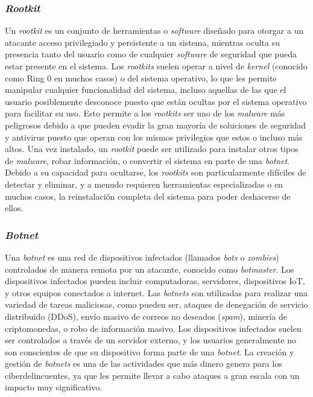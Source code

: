 \subsubsection{\textit{Rootkit}}
Un \textit{rootkit} es un conjunto de herramientas o \textit{software} diseñado para otorgar a un atacante acceso privilegiado y persistente a un sistema, mientras oculta su presencia tanto del usuario como de cualquier \textit{software} de seguridad que pueda estar presente en el sistema. Los \textit{rootkits} suelen operar a nivel de \textit{kernel} (conocido como Ring 0 en muchos casos) o del sistema operativo, lo que les permite manipular cualquier funcionalidad del sistema, incluso aquellas de las que el usuario posiblemente desconoce puesto que están ocultas por el sistema operativo para facilitar su uso. Esto permite a los \textit{rootkits} ser uno de los \textit{malware} más peligrosos debido a que pueden evadir la gran mayoría de soluciones de seguridad y antivirus puesto que operan con los mismos privilegios que estos o incluso más altos. Una vez instalado, un \textit{rootkit} puede ser utilizado para instalar otros tipos de \textit{malware}, robar información, o convertir el sistema en parte de una \textit{botnet}. Debido a su capacidad para ocultarse, los \textit{rootkits} son particularmente difíciles de detectar y eliminar, y a menudo requieren herramientas especializadas o en muchos casos, la reinstalación completa del sistema para poder deshacerse de ellos.

\subsubsection{\textit{Botnet}}
Una \textit{botnet} es una red de dispositivos infectados (llamados \textit{bots} o \textit{zombies}) controlados de manera remota por un atacante, conocido como \textit{botmaster}. Los dispositivos infectados pueden incluir computadoras, servidores, dispositivos IoT, y otros equipos conectados a internet. Las \textit{botnets} son utilizadas para realizar una variedad de tareas maliciosas, como pueden ser, ataques de denegación de servicio distribuido (DDoS), envío masivo de correos no deseados (\textit{spam}), minería de criptomonedas, o robo de información masivo. Los dispositivos infectados suelen ser controlados a través de un servidor externo, y los usuarios generalmente no son conscientes de que su dispositivo forma parte de una \textit{botnet}. La creación y gestión de \textit{botnets} es una de las actividades que más dinero genera para los ciberdelincuentes, ya que les permite llevar a cabo ataques a gran escala con un impacto muy significativo.

